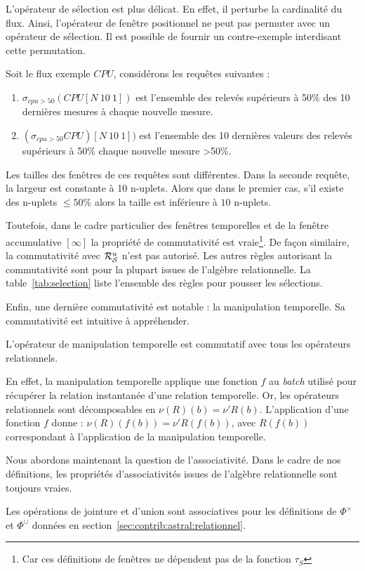 L'opérateur de sélection est plus délicat. En effet, il perturbe la cardinalité du flux. Ainsi, l'opérateur de fenêtre positionnel ne peut pas permuter avec un opérateur de sélection. Il est possible de fournir un contre-exemple interdisant cette permutation.
\begin{example}
Soit le flux exemple $CPU$, considérons les requêtes suivantes :
\begin{enumerate}
	\item $\sigma_{cpu>50} (CPU[N\ 10\ 1])$ est l'ensemble des relevés supérieurs à 50\% des 10 dernières mesures à chaque nouvelle mesure.
	\item $(\sigma_{cpu>50} CPU)[N\ 10\ 1])$ est l'ensemble des 10 dernières valeurs des relevés supérieurs à 50\% chaque nouvelle mesure >50\%.
\end{enumerate}
Les tailles des fenêtres de ces requêtes sont différentes. Dans la seconde requête, la largeur est constante à 10 n-uplets. Alors que dans le premier cas, s'il existe des n-uplets $\leq 50\%$ alors la taille est inférieure à $10$ n-uplets.
\end{example}
Toutefois, dans le cadre particulier des fenêtres temporelles et de la fenêtre accumulative $[\infty]$ la propriété de commutativité est vraie\footnote{Car ces définitions de fenêtres ne dépendent pas de la fonction $\tau_S$}. De façon similaire, la commutativité avec $\mathcal{R}_{\mathcal S}^{u}$ n'est pas autorisé. Les autres règles autorisant la commutativité sont pour la plupart issues de l'algèbre relationnelle. La table~\ref{tab:selection} liste l'ensemble des règles pour pousser les sélections.

Enfin, une dernière commutativité est notable : la manipulation temporelle. Sa commutativité est intuitive à appréhender.
\begin{prop}\label{prop:commut:manipulation}
L'opérateur de manipulation temporelle est commutatif avec tous les opérateurs relationnels.
\end{prop}
En effet, la manipulation temporelle applique une fonction $f$ au \textit{batch} utilisé pour récupérer la relation instantanée d'une relation temporelle. Or, les opérateurs relationnels sont décomposables en $\nu (R)(b) = \nu' R(b)$. L'application d'une fonction $f$ donne : $\nu (R)(f(b)) = \nu' R(f(b))$, avec $R(f(b))$ correspondant à l'application de la manipulation temporelle.

Nous abordons maintenant la question de l'associativité. Dans le cadre de nos définitions, les propriétés d'associativités issues de l'algèbre relationnelle sont toujours vraies.
\begin{prop}\label{prop:assoc-join-union}
Les opérations de jointure et d'union sont associatives pour les définitions de $\Phi^\times$ et $\Phi^\cup$ données en section~\ref{sec:contrib:astral:relationnel}.
\end{prop}

